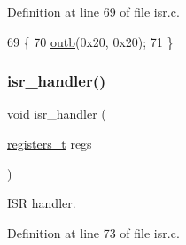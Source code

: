 Definition at line 69 of file isr.\+c.


\begin{DoxyCode}
69            \{
70     \hyperlink{a00164_aa37f5841c54156a4b14fc0d6f626b44f_aa37f5841c54156a4b14fc0d6f626b44f}{outb}(0x20, 0x20);
71 \}
\end{DoxyCode}
\mbox{\label{a00113_a700e3ca056bf69296370f504f2cb6cc8_a700e3ca056bf69296370f504f2cb6cc8}} 
\subsubsection{\texorpdfstring{isr\+\_\+handler()}{isr\_handler()}}
{\footnotesize\ttfamily void isr\+\_\+handler (\begin{DoxyParamCaption}\item[{\hyperlink{a00140_adf58dbaf6139b4957c348711f2026957_adf58dbaf6139b4957c348711f2026957}{registers\+\_\+t}}]{regs }\end{DoxyParamCaption})}



I\+SR handler. 



Definition at line 73 of file isr.\+c.


